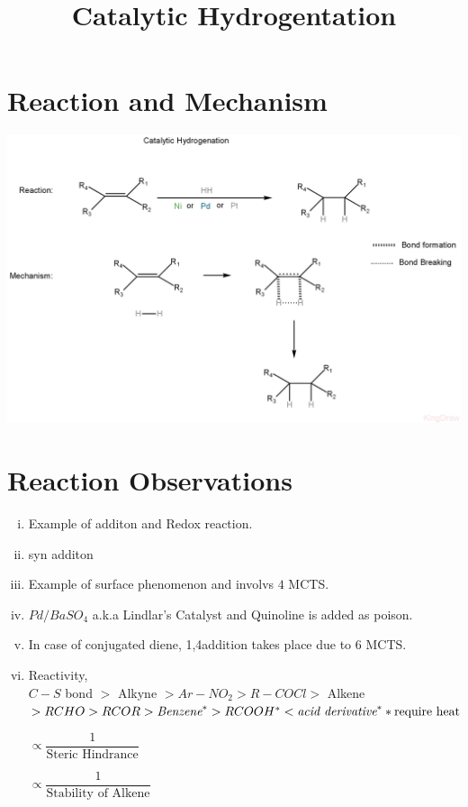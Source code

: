 \documentclass{article}
\title{Catalytic Hydrogentation}
\author{}
\date{}
\begin{document}
\maketitle

\section{Reaction and Mechanism}
\includegraphics[scale=0.24]{p_jpg.JPEG}
\section{Reaction Observations}
\begin{enumerate}[i.]
    \item Example of additon and Redox reaction.
    \item syn additon
    \item Example of surface phenomenon and involvs $4$ MCTS.
    \item $Pd / BaSO_{4}$ a.k.a Lindlar's Catalyst and Quinoline is added as poison.
    \item In case of conjugated diene, 1,4addition takes place due to $6$ MCTS.
    \item Reactivity, \\
          $C-S$ bond $>$ Alkyne $> Ar-NO_{2} > R-COCl>$ Alkene $> RCHO> RCOR> \textit{Benzene}^*>RCOOH^*< \textit{acid derivative}^* \hfill * \text{require heat}$

          $\propto \dfrac{1}{\text{Steric Hindrance}}$

          $\propto \dfrac{1}{\text{Stability of Alkene}}$
\end{enumerate}
\end{document}
